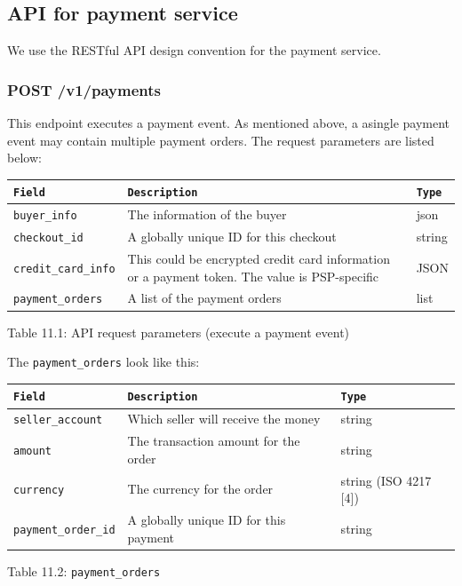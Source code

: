 \documentclass{report}
\theoremstyle{definition}
\let\oldsubsection\subsection
\let\oldsubsubsection\subsubsection
\renewcommand{\subsection}{\oldsubsection*}
\renewcommand{\subsubsection}{\oldsubsubsection*}
\begin{document}
\subsection{API for payment service}

We use the RESTful API design convention for the payment service.

\subsubsection{POST /v1/payments}

This endpoint executes a payment event. As mentioned above, a asingle payment event may contain multiple payment orders. The request parameters are listed below:

\begin{tabular}{|p{4cm}|p{4cm}|p{4cm}|}
\hline
\lstinline|Field| & \lstinline|Description| & \lstinline|Type| \\
\hline
\lstinline|buyer_info| & The information of the buyer & json \\
\hline
\lstinline|checkout_id| & A globally unique ID for this checkout & string \\
\hline
\lstinline|credit_card_info| & This could be encrypted credit card information or a payment token. The value is PSP-specific & JSON \\
\hline
\lstinline|payment_orders| & A list of the payment orders & list \\
\hline
\end{tabular}

Table 11.1: API request parameters (execute a payment event)

The \lstinline|payment_orders| look like this:

\begin{tabular}{|p{4cm}|p{4cm}|p{4cm}|}
\hline
\lstinline|Field| & \lstinline|Description| & \lstinline|Type|  \\
\hline
\lstinline|seller_account| & Which seller will receive the money & string  \\
\hline
\lstinline|amount| & The transaction amount for the order & string  \\
\hline
\lstinline|currency| & The currency for the order & string (ISO 4217 [4])  \\
\hline
\lstinline|payment_order_id| & A globally unique ID for this payment & string \\
\hline
\end{tabular}

Table 11.2: \lstinline|payment_orders|
\end{document}
